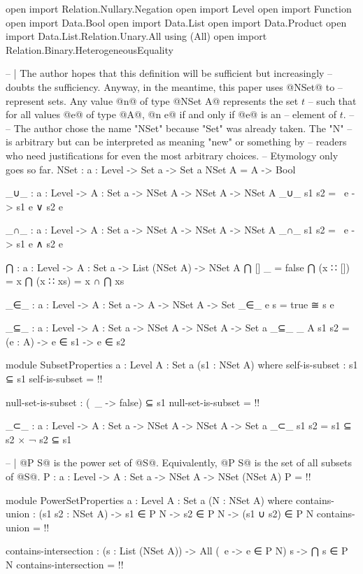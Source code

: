 \begin{code}
open import Relation.Nullary.Negation
open import Level
open import Function
open import Data.Bool
open import Data.List
open import Data.Product
open import Data.List.Relation.Unary.All using (All)
open import Relation.Binary.HeterogeneousEquality

-- | The author hopes that this definition will be sufficient but increasingly
-- doubts the sufficiency.  Anyway, in the meantime, this paper uses @NSet@ to
-- represent sets.  Any value @n@ of type @NSet A@ represents the set \(t\)
-- such that for all values @e@ of type @A@, @n e@ if and only if @e@ is an
-- element of \(t\).
--
-- The author chose the name "NSet" because "Set" was already taken.  The "N"
-- is arbitrary but can be interpreted as meaning "new" or something by
-- readers who need justifications for even the most arbitrary choices.
-- Etymology only goes so far.
NSet : {a : Level} -> Set a -> Set a
NSet A = A -> Bool

_∪_ : {a : Level} -> {A : Set a} -> NSet A -> NSet A -> NSet A
_∪_ s1 s2 = \ e -> s1 e ∨ s2 e

_∩_ : {a : Level} -> {A : Set a} -> NSet A -> NSet A -> NSet A
_∩_ s1 s2 = \ e -> s1 e ∧ s2 e

⋂ : {a : Level} -> {A : Set a} -> List (NSet A) -> NSet A
⋂ [] _ = false
⋂ (x ∷ []) = x
⋂ (x ∷ xs) = x ∩ ⋂ xs

_∈_ : {a : Level} -> {A : Set a} -> A -> NSet A -> Set
_∈_ e s = true ≅ s e

_⊆_ : {a : Level} -> {A : Set a} -> NSet A -> NSet A -> Set a
_⊆_ {_} {A} s1 s2 = (e : A) -> e ∈ s1 -> e ∈ s2

module SubsetProperties {a : Level} {A : Set a} (s1 : NSet A) where
  self-is-subset : s1 ⊆ s1
  self-is-subset = {!!}

  null-set-is-subset : (\ _ -> false) ⊆ s1
  null-set-is-subset = {!!}

_⊂_ : {a : Level} -> {A : Set a} -> NSet A -> NSet A -> Set a
_⊂_ s1 s2 = s1 ⊆ s2 × ¬ s2 ⊆ s1

-- | @P S@ is the power set of @S@.  Equivalently, @P S@ is the set of all subsets of @S@.
P : {a : Level} -> {A : Set a} -> NSet A -> NSet (NSet A)
P = {!!}

module PowerSetProperties {a : Level} {A : Set a} (N : NSet A) where
  contains-union : (s1 s2 : NSet A) -> s1 ∈ P N -> s2 ∈ P N -> (s1 ∪ s2) ∈ P N
  contains-union = {!!}

  contains-intersection : (s : List (NSet A)) ->
                          All (\ e -> e ∈ P N) s ->
                          ⋂ s ∈ P N
  contains-intersection = {!!}


\end{code}
